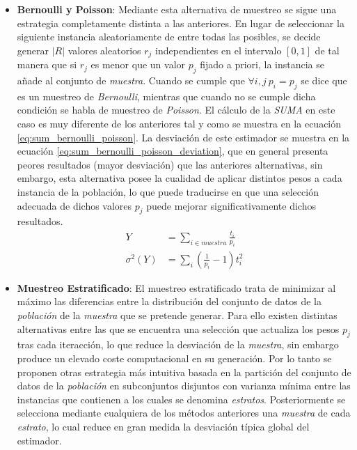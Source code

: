 \documentclass{subfiles}
\begin{document}
\begin{itemize}
          \item \textbf{Bernoulli y Poisson}: Mediante esta alternativa de muestreo se sigue una estrategia completamente distinta a las anteriores. En lugar de seleccionar la siguiente instancia aleatoriamente de entre todas las posibles, se decide generar $|R|$ valores aleatorios $r_j$ independientes en el intervalo $[0,1]$ de tal manera que si $r_j$ es menor que un valor $p_j$ fijado a priori, la instancia se añade al conjunto de \emph{muestra}. Cuando se cumple que $\forall i, j \ p_i = p_j$ se dice que es un muestreo de \emph{Bernoulli}, mientras que cuando no se cumple dicha condición se habla de muestreo de \emph{Poisson}. El cálculo de la \emph{SUMA} en este caso es muy diferente de los anteriores tal y como se muestra en la ecuación \eqref{eq:sum_bernoulli_poisson}. La desviación de este estimador se muestra en la ecuación \eqref{eq:sum_bernoulli_poisson_deviation}, que en general presenta peores resultados (mayor desviación) que las anteriores alternativas, sin embargo, esta alternativa posee la cualidad de aplicar distintos pesos a cada instancia de la población, lo que puede traducirse en que una selección adecuada de dichos valores $p_j$ puede mejorar significativamente dichos resultados.
            \begin{align}
            \label{eq:sum_bernoulli_poisson}
              Y &= \sum_{i \in muestra }\frac{t_i}{p_i} \\
            \label{eq:sum_bernoulli_poisson_deviation}
              \sigma^2(Y) &= \sum_i(\frac{1}{p_i}-1)t_i^2
            \end{align}

          \item \textbf{Muestreo Estratificado}: El muestreo estratificado trata de minimizar al máximo las diferencias entre la distribución del conjunto de datos de la \emph{población} de la \emph{muestra} que se pretende generar. Para ello existen distintas alternativas entre las que se encuentra una selección que  actualiza los pesos $p_j$ tras cada iteracción, lo que reduce la desviación de la \emph{muestra}, sin embargo produce un elevado coste computacional en su generación. Por lo tanto se proponen otras estrategia más intuitiva basada en la partición del conjunto de datos de la \emph{población} en subconjuntos disjuntos con varianza mínima entre las instancias que contienen a los cuales se denomina \emph{estratos}. Posteriormente se selecciona mediante cualquiera de los métodos anteriores una \emph{muestra} de cada \emph{estrato}, lo cual reduce en gran medida la desviación típica global del estimador.

        \end{itemize}
\end{document}
